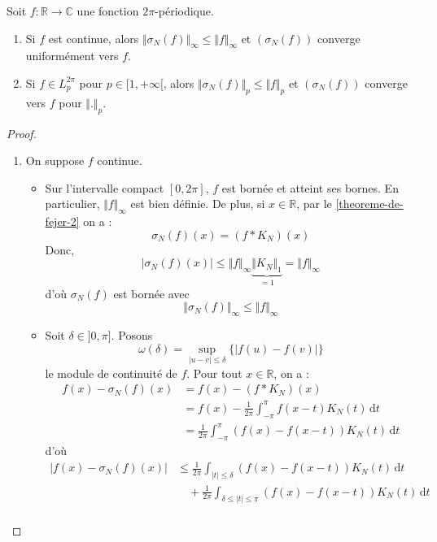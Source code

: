 
	\begin{theorem}[Fejér]
		Soit $f : \mathbb{R} \rightarrow \mathbb{C}$ une fonction $2\pi$-périodique.
		\begin{enumerate}[label=(\roman*)]
			\item Si $f$ est continue, alors $\Vert \sigma_N(f) \Vert_\infty \leq \Vert f \Vert_\infty$ et $(\sigma_N(f))$ converge uniformément vers $f$.
			\item Si $f \in L_p^{2\pi}$ pour $p \in [1,+\infty[$, alors $\Vert \sigma_N(f) \Vert_p \leq \Vert f \Vert_p$ et $(\sigma_N(f))$ converge vers $f$ pour $\Vert . \Vert_p$.
		\end{enumerate}
	\end{theorem}

	\begin{proof}
		\begin{enumerate}[label=(\roman*)]
			\item On suppose $f$ continue.
			\begin{itemize}
				\item Sur l'intervalle compact $[0, 2\pi]$, $f$ est bornée et atteint ses bornes. En particulier, $\Vert f \Vert_\infty$ est bien définie. De plus, si $x \in \mathbb{R}$, par le \cref{theoreme-de-fejer-2} on a :
				\[ \sigma_N(f)(x) = (f * K_N)(x) \]
				Donc,
				\[ \vert \sigma_N(f)(x) \vert \leq \Vert f \Vert_\infty \underbrace{\Vert K_N \Vert_1}_{=1} = \Vert f \Vert_\infty \]
				d'où $\sigma_N(f)$ est bornée avec
				\[ \Vert \sigma_N(f) \Vert_\infty \leq \Vert f \Vert_\infty \]
				\item Soit $\delta \in ]0,\pi]$. Posons
				\[ \omega(\delta) = \sup_{\vert u - v \vert \leq \delta} \{ \vert f(u) - f(v) \vert \} \]
				le module de continuité de $f$. Pour tout $x \in \mathbb{R}$, on a :
				\begin{align*}
					f(x) - \sigma_N(f)(x) &= f(x) - (f * K_N)(x) \\
					&= f(x) - \frac{1}{2\pi} \int_{-\pi}^{\pi} f(x-t) K_N(t) \, \mathrm{d}t \\
					&= \frac{1}{2\pi} \int_{-\pi}^{\pi} (f(x) - f(x-t)) K_N(t) \, \mathrm{d}t \tag{*}
				\end{align*}
				d'où
				\begin{align*}
					\vert f(x) - \sigma_N(f)(x) \vert &\leq \frac{1}{2\pi} \int_{\vert t \vert \leq \delta} (f(x) - f(x-t)) K_N(t) \, \mathrm{d}t \\
					&\quad + \frac{1}{2\pi} \int_{\delta \leq \vert t \vert \leq \pi} (f(x) - f(x-t)) K_N(t) \, \mathrm{d}t \\

\end{align*}
\end{itemize}
\end{enumerate}
\end{proof}
